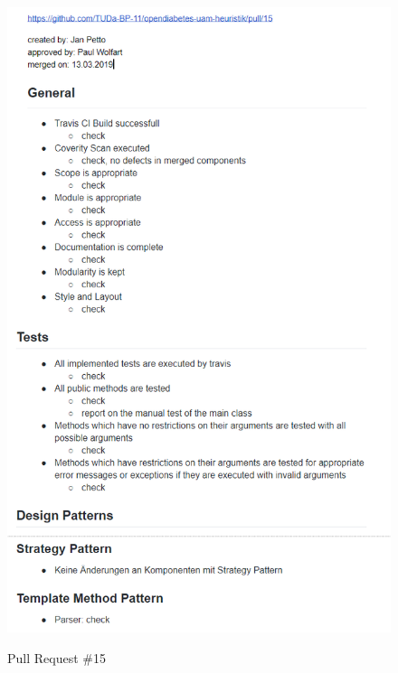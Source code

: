 \documentclass[accentcolor=tud0b,12pt,paper=a4]{tudreport}
\begin{document}
\begin{figure}[h]
\centering
\caption{Pull Request \#15}
\includegraphics[width=\textwidth,height=\textheight,keepaspectratio]{pr-15}
\label{pr:15}
\end{figure}
\end{document}
